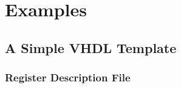 \documentclass[letterpaper,10pt,english]{sphinxmanual}
\begin{document}
\section{Examples}
\label{\detokenize{examples::doc}}\label{\detokenize{examples:examples}}

\subsection{A Simple VHDL Template}
\label{\detokenize{examples:a-simple-vhdl-template}}

\subsubsection{Register Description File}
\label{\detokenize{examples:register-description-file}}
\begin{sphinxVerbatim}[commandchars=\\\{\}]
      
       
      
       
      
       



\end{sphinxVerbatim}
\end{document}
